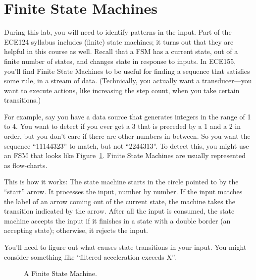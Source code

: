 \documentclass[10pt]{article}
\begin{document}
\section{Finite State Machines}
During this lab, you will need to identify patterns in the input. %
Part of the ECE124 syllabus includes (finite) state machines; it turns out that they are helpful in this course as well. Recall that a FSM has a current state, out of a finite number of states, and changes state in response to inputs. In ECE155, you'll find Finite State Machines to be useful for finding a sequence that satisfies some rule, in a stream of data. (Technically, you actually want a transducer---you want to execute actions, like increasing the step count, when you take certain transitions.)

For example, say you have a data source that generates integers in the range of 1 to 4. You want to detect if you ever get a 3 that is preceded by a 1 and a 2 in order, but you don't care if there are other numbers in between. So you want the sequence ``11144323'' to match, but not ``2244313''. To detect this, you might use an FSM that looks like Figure~\ref{fig:FSM}. Finite State Machines are usually represented as flow-charts.

This is how it works: The state machine starts in the circle pointed to by the ``start'' arrow. It processes the input, number by number. If the input matches the label of an arrow coming out of the current state, the machine takes the transition indicated by the arrow. After all the input is consumed, the state machine accepts the input if it finishes in a state with a double border (an accepting state); otherwise, it rejects the input.

You'll need to figure out what causes state transitions in your input. You might consider something like ``filtered acceleration exceeds X''.

\begin{figure}
\begin{center}
\end{center}
\caption{\label{fig:FSM}A Finite State Machine.}
\end{figure}
\end{document}
